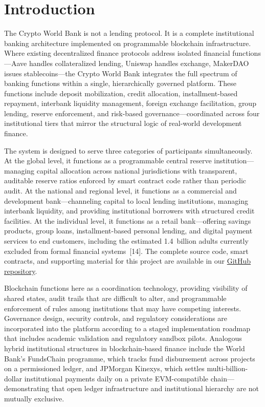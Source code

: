 \documentclass[12pt,a4paper]{report}
\begin{document}
\chapter{Introduction}

The Crypto World Bank is not a lending protocol. It is a complete institutional banking architecture implemented on programmable blockchain infrastructure. Where existing decentralized finance protocols address isolated financial functions---Aave handles collateralized lending, Uniswap handles exchange, MakerDAO issues stablecoins---the Crypto World Bank integrates the full spectrum of banking functions within a single, hierarchically governed platform. These functions include deposit mobilization, credit allocation, installment-based repayment, interbank liquidity management, foreign exchange facilitation, group lending, reserve enforcement, and risk-based governance---coordinated across four institutional tiers that mirror the structural logic of real-world development finance.

The system is designed to serve three categories of participants simultaneously. At the global level, it functions as a programmable central reserve institution---managing capital allocation across national jurisdictions with transparent, auditable reserve ratios enforced by smart contract code rather than periodic audit. At the national and regional level, it functions as a commercial and development bank---channeling capital to local lending institutions, managing interbank liquidity, and providing institutional borrowers with structured credit facilities. At the individual level, it functions as a retail bank---offering savings products, group loans, installment-based personal lending, and digital payment services to end customers, including the estimated 1.4~billion adults currently excluded from formal financial systems~[14]. The complete source code, smart contracts, and supporting material for this project are available in our \href{https://github.com/Yuvraajrahman/Cryto-World-Bank}{GitHub repository}.

Blockchain functions here as a coordination technology, providing visibility of shared states, audit trails that are difficult to alter, and programmable enforcement of rules among institutions that may have competing interests. Governance design, security controls, and regulatory considerations are incorporated into the platform according to a staged implementation roadmap that includes academic validation and regulatory sandbox pilots. Analogous hybrid institutional structures in blockchain-based finance include the World Bank's FundsChain programme, which tracks fund disbursement across projects on a permissioned ledger, and JPMorgan Kinexys, which settles multi-billion-dollar institutional payments daily on a private EVM-compatible chain---demonstrating that open ledger infrastructure and institutional hierarchy are not mutually exclusive.
\end{document}
